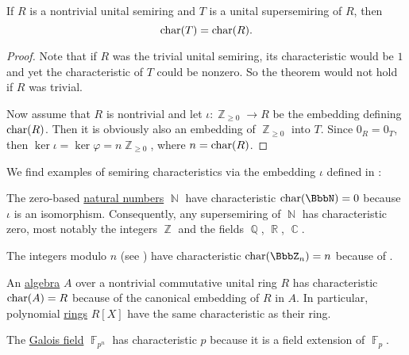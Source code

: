\begin{proposition}\label{thm:embedding_preserves_characteristic}
  If \( R \) is a nontrivial unital semiring and \( T \) is a unital supersemiring of \( R \), then
  \begin{equation*}
    \operatorname{char}(T) = \operatorname{char}(R).
  \end{equation*}
\end{proposition}
\begin{proof}
  Note that if \( R \) was the trivial unital semiring, its characteristic would be \( 1 \) and yet the characteristic of \( T \) could be nonzero. So the theorem would not hold if \( R \) was trivial.

  Now assume that \( R \) is nontrivial and let \( \iota: \BbbZ_{\geq 0} \to R \) be the embedding defining \( \operatorname{char}(R) \). Then it is obviously also an embedding of \( \BbbZ_{\geq 0} \) into \( T \). Since \( 0_R = 0_T \), then \( \ker \iota = \ker \varphi = n\BbbZ_{\geq 0} \), where \( n = \operatorname{char}(R) \).
\end{proof}

\begin{example}\label{ex:semiring_characteristic}
  We find examples of semiring characteristics via the embedding \( \iota \) defined in :

  \begin{thmenum}
     The zero-based \hyperref[def:natural_numbers]{natural numbers} \( \BbbN \) have characteristic \( \op{char}(\BbbN) = 0 \) because \( \iota \) is an isomorphism. Consequently, any supersemiring of \( \BbbN \) has characteristic zero, most notably the integers \( \BbbZ \) and the fields \( \BbbQ \), \( \BbbR \), \( \BbbC \).

     The integers modulo \( n \) (see ) have characteristic \( \op{char}(\BbbZ_n) = n \) because of .

     An \hyperref[def:algebra_over_ring]{algebra} \( A \) over a nontrivial commutative unital ring \( R \) has characteristic \( \operatorname{char}(A) = R \) because of the canonical embedding of \( R \) in \( A \). In particular, polynomial \hyperref[def:algebra_of_polynomials]{rings} \( R[X] \) have the same characteristic as their ring.

     The \hyperref[thm:galois_field_existence]{Galois field} \( \BbbF_{p^n} \) has characteristic \( p \) because it is a field extension of \( \BbbF_p \).
  \end{thmenum}
\end{example}

